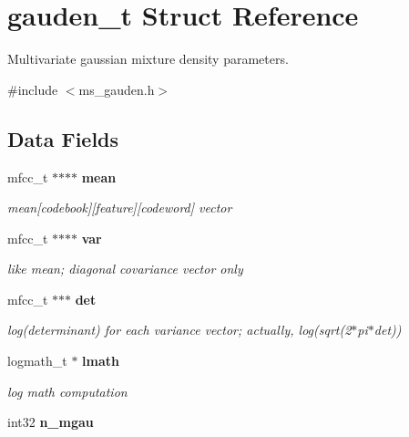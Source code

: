 \section{gauden\-\_\-t Struct Reference}
\label{structgauden__t}


Multivariate gaussian mixture density parameters.  




{\ttfamily \#include $<$ms\-\_\-gauden.\-h$>$}

\subsection*{Data Fields}
\begin{DoxyCompactItemize}
\item 
mfcc\-\_\-t $\ast$$\ast$$\ast$$\ast$ {\bf mean}\label{structgauden__t_aa76d63009601dcb6b99f17db96167f37}

\begin{DoxyCompactList}\small\item\em mean[codebook][feature][codeword] vector \end{DoxyCompactList}\item 
mfcc\-\_\-t $\ast$$\ast$$\ast$$\ast$ {\bf var}\label{structgauden__t_a172cb69c018608ab8c33d54e6f0fdf19}

\begin{DoxyCompactList}\small\item\em like mean; diagonal covariance vector only \end{DoxyCompactList}\item 
mfcc\-\_\-t $\ast$$\ast$$\ast$ {\bf det}\label{structgauden__t_a315918a44ff97b95a6fcdf8739d8089b}

\begin{DoxyCompactList}\small\item\em log(determinant) for each variance vector; actually, log(sqrt(2$\ast$pi$\ast$det)) \end{DoxyCompactList}\item 
logmath\-\_\-t $\ast$ {\bf lmath}\label{structgauden__t_ae05c9b82d8a586bea347681ebe04bb83}

\begin{DoxyCompactList}\small\item\em log math computation \end{DoxyCompactList}\item 
int32 {\bf n\-\_\-mgau}\label{structgauden__t_af15df11bd2f3ab0290e0a33ca15c836c}


\end{DoxyCompactItemize}

